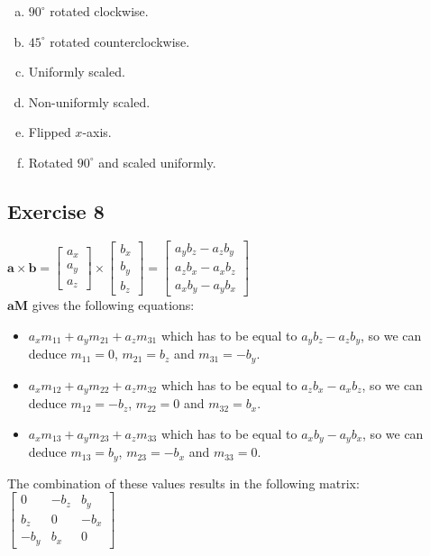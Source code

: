 \documentclass[11pt]{article}
\begin{document}
\begin{enumerate}[a.]
	\item $90^\circ$ rotated clockwise.
	\item $45^\circ$ rotated counterclockwise.
	\item Uniformly scaled.
	\item Non-uniformly scaled.
	\item Flipped $x$-axis.
	\item Rotated $90^\circ$ and scaled uniformly.
\end{enumerate}

\subsection{Exercise 8}

$\textbf{a}\times\textbf{b}=\begin{bmatrix}
	a_x \\ a_y \\ a_z
\end{bmatrix}\times\begin{bmatrix}
	b_x \\ b_y \\ b_z
\end{bmatrix}=
\begin{bmatrix}
	a_yb_z-a_zb_y \\ a_zb_x-a_xb_z \\ a_xb_y-a_yb_x
\end{bmatrix}$ \\
$\textbf{aM}$ gives the following equations:

\begin{itemize}
	\item $a_xm_{11}+a_ym_{21}+a_zm_{31}$ which has to be equal to $a_yb_z-a_zb_y$, so we can deduce $m_{11}=0$, $m_{21}=b_z$ and $m_{31}=-b_y$.
	\item $a_xm_{12}+a_ym_{22}+a_zm_{32}$ which has to be equal to $a_zb_x-a_xb_z$, so we can deduce $m_{12}=-b_z$, $m_{22}=0$ and $m_{32}=b_x$.
	\item $a_xm_{13}+a_ym_{23}+a_zm_{33}$ which has to be equal to $a_xb_y-a_yb_x$, so we can deduce $m_{13}=b_y$, $m_{23}=-b_x$ and $m_{33}=0$.
\end{itemize}

The combination of these values results in the following matrix: $\begin{bmatrix}
	0 & -b_z & b_y \\
	b_z & 0 & -b_x \\
	-b_y & b_x & 0
\end{bmatrix}$
\end{document}
